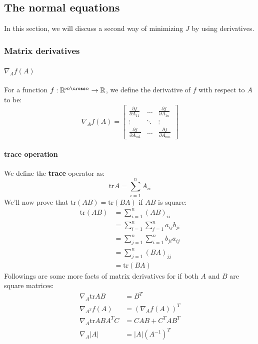 \documentclass{article}
\begin{document}
\subsection{The normal equations}
In this section, we will discuss a second way of minimizing $J$ by using derivatives.
\subsubsection{Matrix derivatives}
\paragraph{$\nabla_A f(A)$} For a function $f: \mathbb{R}^{m \cross n} \rightarrow \mathbb{R}$, we define the derivative of $f$ with respect to $A$ to be:
\begin{equation}
	\label{eq:gradient_definition}
	\nabla_A f(A) = 
	\begin{bmatrix}
		\frac{\partial f}{\partial A_{11}} & \ldots & \frac{\partial f}{\partial A_{1n}} \\
		\vdots & \ddots & \vdots \\
		\frac{\partial f}{\partial A_{m1}} & \ldots & \frac{\partial f}{\partial A_{mn}}
	\end{bmatrix}
\end{equation}
\paragraph{trace operation} We define the {\bf trace} operator as:
\begin{equation}
	\label{eq:trace_definition}
	\text{tr} A = \sum_{i=1}^{n}A_{ii}
\end{equation}
We'll now prove that $\text{tr} (AB) = \text{tr} (BA)$ if $AB$ is square: 
\begin{align*}
	\text{tr} (AB) &= \sum_{i=1}^{n}(AB)_{ii} \\
	&= \sum_{i=1}^{n}\sum_{j=1}^{n}a_{ij}b_{ji} \\
	&= \sum_{j=1}^{n}\sum_{i=1}^{n}b_{ji}a_{ij} \\
	&= \sum_{j=1}^{n}(BA)_{jj} \\
	&= \text{tr} (BA)
\end{align*}
Followings are some more facts of matrix derivatives for if both $A$ and $B$ are square matrices:
\begin{align}
	\label{eq:gradient_equations}
	\nabla_A \text{tr} AB &= B^T \\
	\nabla_{A^T} f(A) &= \left(\nabla_A f(A)\right)^T \\
	\nabla_A \text{tr} ABA^TC &= CAB + C^TAB^T \\
	\nabla_A |A| &= |A| \left(A^{-1}\right)^T
\end{align}
\end{document}

